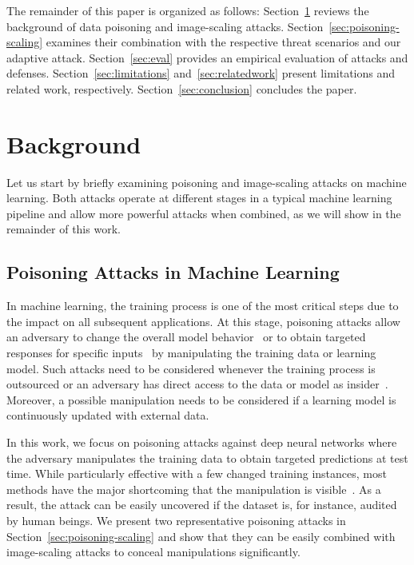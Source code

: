\documentclass[conference]{IEEEtran}
\begin{document}
The remainder of this paper is organized as follows: 
Section~\ref{sec:background} reviews the background of data poisoning 
and image-scaling attacks. Section~\ref{sec:poisoning-scaling} examines 
their combination with the respective threat {scenarios\EndAccSupp{}} and our {adaptive\EndAccSupp{}} 
attack.
Section~\ref{sec:eval} provides an empirical evaluation of attacks and 
defenses.
Section~\ref{sec:limitations} and~\ref{sec:relatedwork} present 
limitations and related work, respectively. 
Section~\ref{sec:conclusion} concludes the paper.



\section{Background}\label{sec:background}
Let us start by briefly examining poisoning and image-scaling 
attacks on machine learning. Both attacks operate at {different\EndAccSupp{}} stages 
in a typical machine learning pipeline and allow more powerful attacks 
when combined, as we will show in the remainder of this work.

\subsection{Poisoning Attacks in Machine Learning}
In machine learning, the training process is one of the most 
critical steps due to the impact on all subsequent applications. At 
this stage, poisoning attacks allow an adversary to change the overall 
{model\EndAccSupp{}} behavior~\citep[e.g.][]{KloLas10a,BigNelLas11}
or to obtain {targeted\EndAccSupp{}} responses for {specific\EndAccSupp{}} 
inputs~\citep[e.g.][]{GuDolGar17,ShaHuaNaj+18,LiuMaAaf+18} by 
manipulating the training data or learning model. Such attacks need to 
be considered whenever the training process is outsourced or an 
adversary has direct {access\EndAccSupp{}} to the data or {model\EndAccSupp{}} as 
insider~\citep{Sto15}. Moreover, a possible manipulation needs to be 
considered if a learning {model\EndAccSupp{}} is continuously updated with external 
data.


In this work, we focus on poisoning attacks against deep neural 
networks where the adversary manipulates the training data to obtain 
targeted {predictions\EndAccSupp{}} at test time. While particularly {effective\EndAccSupp{}} with a 
few changed training instances, most methods have the major shortcoming 
that the manipulation is visible~\citep[e.g.][]{GuDolGar17, 
	LiuMaAaf+18}. As a result, the attack can be easily uncovered if 
	the dataset is, for instance, audited by human beings.
We present two representative 
poisoning attacks in Section~\ref{sec:poisoning-scaling} and show 
that they can be easily combined with image-scaling attacks to
conceal manipulations significantly.
\end{document}
